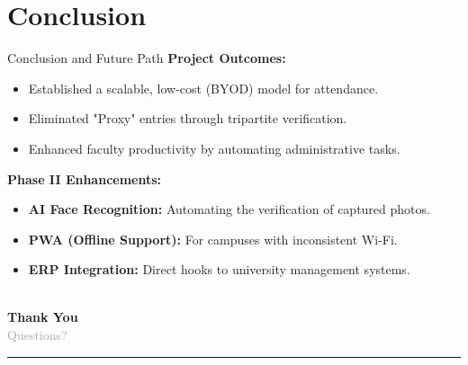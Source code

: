 \documentclass[11pt, aspectratio=169]{beamer}
\begin{document}
\section{Conclusion}
\begin{frame}{Conclusion and Future Path}
    \textbf{Project Outcomes:}
    \begin{itemize}
        \item Established a scalable, low-cost (BYOD) model for attendance.
        \item Eliminated "Proxy" entries through tripartite verification.
        \item Enhanced faculty productivity by automating administrative tasks.
    \end{itemize}
    \vspace{0.4cm}
    \textbf{Phase II Enhancements:}
    \begin{itemize}
        \item \textbf{AI Face Recognition:} Automating the verification of captured photos.
        \item \textbf{PWA (Offline Support):} For campuses with inconsistent Wi-Fi.
        \item \textbf{ERP Integration:} Direct hooks to university management systems.
    \end{itemize}
\end{frame}

{
\begin{frame}[plain]
    \centering
    \textcolor{accentteal}{\Huge \faCheckCircle} \\
    \vspace{1cm}
    {\Huge \textcolor{mainblue}{\textbf{Thank You}}} \\
    \vspace{0.4cm}
    {\Large \textcolor{darkgray}{Questions?}} \\
    \vfill
    \textcolor{accentteal}{\rule{0.2\textwidth}{2pt}} \\
    \vspace{0.4cm}
    \insertauthor \\
    \scriptsize \insertinstitute
\end{frame}
}
\end{document}
